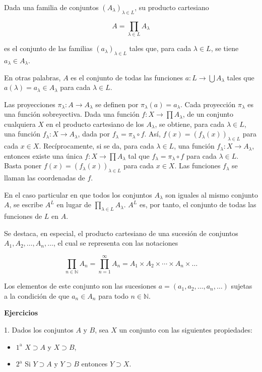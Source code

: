Dada una familia de conjuntos \( (A_\lambda)_{\lambda \in L} \), su producto cartesiano

\[
A = \prod_{\lambda \in L} A_\lambda
\]

es el conjunto de las familias \((a_\lambda)_{\lambda \in L}\) tales que, para cada \(\lambda \in L\), se tiene \(a_\lambda \in A_\lambda\).

En otras palabras, \(A\) es el conjunto de todas las funciones \(a: L \to \bigcup A_\lambda\) tales que \(a(\lambda) = a_\lambda \in A_\lambda\) para cada \(\lambda \in L\).

Las proyecciones \(\pi_\lambda: A \to A_\lambda\) se definen por \(\pi_\lambda(a) = a_\lambda\). Cada proyección \(\pi_\lambda\) es una función sobreyectiva. Dada una función \(f: X \to \prod A_\lambda\), de un conjunto cualquiera \(X\) en el producto cartesiano de los \(A_\lambda\), se obtiene, para cada \(\lambda \in L\), una función \(f_\lambda: X \to A_\lambda\), dada por \(f_\lambda = \pi_\lambda \circ f\). Así, \(f(x) = (f_\lambda(x))_{\lambda \in L}\) para cada \(x \in X\). Recíprocamente, si se da, para cada \(\lambda \in L\), una función \(f_\lambda: X \to A_\lambda\), entonces existe una única \(f: X \to \prod A_\lambda\) tal que \(f_\lambda = \pi_\lambda \circ f\) para cada \(\lambda \in L\). Basta poner \(f(x) = (f_\lambda(x))_{\lambda \in L}\) para cada \(x \in X\). Las funciones \(f_\lambda\) se llaman las coordenadas de \(f\).

En el caso particular en que todos los conjuntos \(A_\lambda\) son iguales al mismo conjunto \(A\), se escribe \(A^L\) en lugar de \(\prod_{\lambda \in L} A_\lambda\). \(A^L\) es, por tanto, el conjunto de todas las funciones de \(L\) en \(A\).

Se destaca, en especial, el producto cartesiano de una sucesión de conjuntos \(A_1, A_2, \dots, A_n, \dots\), el cual se representa con las notaciones

\[
\prod_{n \in \mathbb{N}} A_n = \prod_{n=1}^{\infty} A_n = A_1 \times A_2 \times \cdots \times A_n \times \dots
\]

Los elementos de este conjunto son las sucesiones \(a = (a_1, a_2, \dots, a_n, \dots)\) sujetas a la condición de que \(a_n \in A_n\) para todo \(n \in \mathbb{N}\).

\textbf{Ejercicios}

1. Dados los conjuntos \(A\) y \(B\), sea \(X\) un conjunto con las siguientes propiedades:

\begin{itemize}
\item[] \(1^\text{a}\) \(X \supset A\) y \(X \supset B\),
\item[] \(2^\text{a}\) Si \(Y \supset A\) y \(Y \supset B\) entonces \(Y \supset X\).
\end{itemize}

